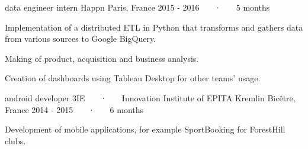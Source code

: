\begin{cventries}
  \cventry
    {data engineer intern} %
    {Happn} %
    {Paris, France} %
    {2015 - 2016 ~~~·~~~ 5 months} %
    {
      \begin{cvitems} %
        \item {Implementation of a distributed ETL in Python that transforms and gathers data from various sources to Google BigQuery.}
        \item {Making of product, acquisition and business analysis.}
        \item {Creation of dashboards using Tableau Desktop for other teams' usage.}
      \end{cvitems}
    }

  \cventry
    {android developer} %
    {3IE ~~~·~~~ Innovation Institute of EPITA} %
    {Kremlin Bicêtre, France} %
    {2014 - 2015 ~~~·~~~ 6 months} %
    {
      \begin{cvitems} %
        \item {Development of mobile applications, for example SportBooking for ForestHill clubs.}
      \end{cvitems}
    }


\end{cventries}
